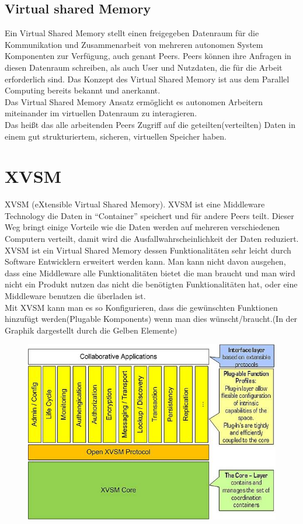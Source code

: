 \documentclass[a4paper,12pt]{scrreprt}
\begin{document}
			
			
						
			\subsection{Virtual shared Memory}
			
			
			Ein Virtual Shared Memory stellt einen freigegeben Datenraum für die Kommunikation und Zusammenarbeit von mehreren autonomen System Komponenten zur Verfügung, auch genant Peers. Peers können ihre Anfragen in diesen Datenraum schreiben, als auch User und Nutzdaten, die für die Arbeit erforderlich sind.
			Das Konzept des Virtual Shared Memory ist aus dem Parallel Computing bereits bekannt und anerkannt.\\
			Das Virtual Shared Memory Ansatz ermöglicht es autonomen Arbeitern miteinander im virtuellen Datenraum zu interagieren.\\
			Das heißt das alle arbeitenden Peers  Zugriff auf die geteilten(verteilten) Daten in einem gut strukturiertem, sicheren, virtuellen Speicher haben.
			 
			
			
			  
		
		\section{XVSM}
		XVSM (eXtensible Virtual Shared Memory). XVSM ist eine Middleware Technology die Daten in “Container” speichert  und für andere Peers teilt. Dieser Weg bringt einige Vorteile wie die Daten werden auf mehreren verschiedenen Computern verteilt, damit wird die Ausfallwahrscheinlichkeit der Daten reduziert.\\
		
		XVSM ist ein Virtual Shared Memory dessen Funktionalitäten sehr leicht durch Software Entwicklern erweitert werden kann. Man kann nicht davon ausgehen, dass eine Middleware alle Funktionalitäten bietet die man braucht und man wird nicht ein Produkt nutzen das nicht die benötigten Funktionalitäten hat, oder eine Middleware benutzen die überladen ist.\\
		Mit XVSM kann man es so Konfigurieren, dass die gewünschten Funktionen hinzufügt werden(Plugable Komponents) wenn man dies wünscht/braucht.(In der Graphik dargestellt durch die Gelben Elemente)\\
		\begin{figure}[h]
			\centering
			\includegraphics[width=0.7\linewidth]{./08570620af}
			\caption{}
			\label{fig:08570620af}
		\end{figure}
\end{document}
